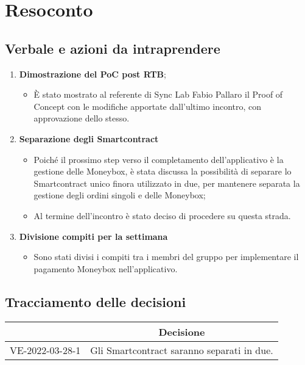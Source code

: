 \section{Resoconto}
\subsection{Verbale e azioni da intraprendere}

\begin{enumerate}
	\item \textbf{Dimostrazione del PoC post RTB};
	\begin{itemize}
		\item È stato mostrato al referente di Sync Lab Fabio Pallaro il Proof of Concept con le modifiche apportate dall'ultimo incontro, con approvazione dello stesso.
	\end{itemize}
	\item \textbf{Separazione degli Smartcontract}
	\begin{itemize}
		\item Poiché il prossimo step verso il completamento dell'applicativo è la gestione delle Moneybox,
		 è stata discussa la possibilità di separare lo Smartcontract unico finora utilizzato in due, per mantenere separata la gestione degli ordini 
		 singoli e delle Moneybox;
		\item Al termine dell'incontro è stato deciso di procedere su questa strada.
	\end{itemize}
	\item \textbf{Divisione compiti per la settimana}
	\begin{itemize}
		\item Sono stati divisi i compiti tra i membri del gruppo per implementare il pagamento Moneybox nell'applicativo.
	\end{itemize}
\end{enumerate}

\pagebreak

\subsection{Tracciamento delle decisioni}

\begin{table}[H]
	\centering
	\renewcommand{\arraystretch}{1.8}
	\begin{tabular}{c | p{10cm}}
		\rowcolor[HTML]{125E28}
		\multicolumn{1}{c}{\color[HTML]{FFFFFF} \textbf{ID}} &
		\multicolumn{1}{c}{\color[HTML]{FFFFFF} \textbf{Decisione}} \\
		\hline
		VE-2022-03-28-1 & Gli Smartcontract saranno separati in due. \\ \hline
	\end{tabular}
\end{table}